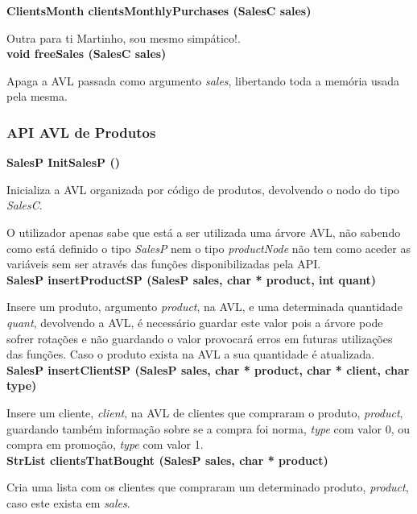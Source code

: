 \documentclass[10pt] {article}
\begin{document}
\noindent \textbf {ClientsMonth clientsMonthlyPurchases (SalesC sales)}
\par Outra para ti Martinho, sou mesmo simpático!. \\

\noindent \textbf {void freeSales (SalesC sales)}
\par Apaga a AVL passada como argumento \emph{sales}, libertando toda a memória usada pela mesma. \\

 \subsubsection{API AVL de Produtos}
\noindent \textbf {SalesP InitSalesP ()}
\par Inicializa a AVL organizada por código de produtos, devolvendo o nodo do tipo \emph{SalesC}.
\par O utilizador apenas sabe que está a ser utilizada uma árvore AVL, não sabendo como está definido o tipo 
\emph{SalesP} nem o tipo \emph{productNode} não tem como aceder as variáveis sem ser através das funções 
disponibilizadas pela API. \\

\newpage
\noindent \textbf {SalesP insertProductSP (SalesP sales, char * product, int quant)}
\par Insere um produto, argumento \emph{product}, na AVL, e uma determinada quantidade \emph{quant}, 
devolvendo a AVL, é necessário guardar este valor pois a árvore pode sofrer rotações e não guardando o valor 
provocará erros em futuras utilizações das funções. Caso o produto exista na AVL a sua quantidade é atualizada.\\

\noindent \textbf {SalesP insertClientSP (SalesP sales, char * product, char * client, char type)}
\par Insere um cliente, \emph{client}, na AVL de clientes que compraram o produto, \emph{product}, guardando 
também informação sobre se a compra foi norma, \emph{type} com valor 0, ou compra em promoção, 
\emph{type} com valor 1.\\

\noindent \textbf {StrList clientsThatBought (SalesP sales, char * product)}
\par Cria uma lista com os clientes que compraram um determinado produto, \emph{product}, caso este exista em
 \emph{sales}.\\
 
\end{document}
